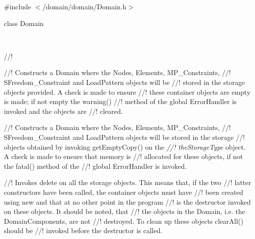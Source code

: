 
\indent \#include $<$/domain/domain/Domain.h$>$  

\indent class Domain  



\   

//!    


//! Constructs a Domain where the Nodes, Elements, MP\_Constraints,
//! SFreedom\_Constraint and LoadPattern objects will be
//! stored in the storage objects provided. A check is made to ensure
//! these container objects are empty is made; if not empty the warning()
//! method of the global ErrorHandler is invoked and the objects are
//! cleared. 

//! Constructs a Domain where the Nodes, Elements, MP\_Constraints,
//! SFreedom\_Constraint and LoadPattern objects will be stored in the storage
//! objects obtained by invoking getEmptyCopy() on the {\em
//! theStorageType} object. A check is made to ensure that memory is
//! allocated for these objects, if not the fatal() method of the
//! global ErrorHandler is invoked.    

//! Invokes delete on all the storage objects. This means that, if the two
//! latter constructors have been called, the container objects must have 
//! been created using \p new and that at no other point in the program
//! is the destructor invoked on these objects. It should be noted, that
//! the objects in the Domain, i.e. the DomainComponents, are not
//! destroyed. To clean up these objects clearAll() should be
//! invoked before the destructor is called. 


